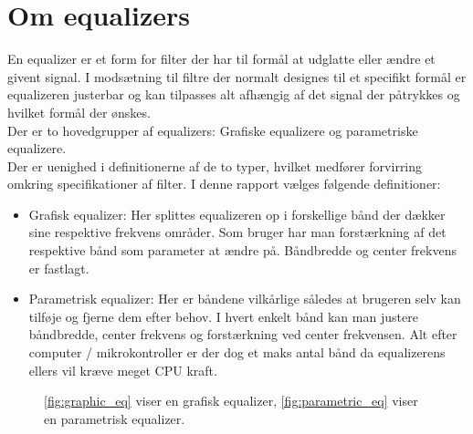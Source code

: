 \section{Om equalizers}\label{sec:equalizer}

En equalizer er et form for filter der har til formål at udglatte eller ændre et givent signal. I modsætning til filtre der normalt designes til et specifikt formål er equalizeren justerbar og kan tilpasses alt afhængig af det signal der påtrykkes og hvilket formål der ønskes.\\

Der er to hovedgrupper af equalizers: Grafiske equalizere og parametriske equalizere.\\
Der er uenighed i definitionerne af de to typer, hvilket medfører forvirring omkring specifikationer af filter. I denne rapport vælges følgende definitioner:

\begin{itemize}
	\item Grafisk equalizer: Her splittes equalizeren op i forskellige bånd der dækker sine respektive frekvens områder. Som bruger har man forstærkning af det respektive bånd som parameter at ændre på. Båndbredde og center frekvens er fastlagt.
	\item Parametrisk equalizer: Her er båndene vilkårlige således at brugeren selv kan tilføje og fjerne dem efter behov. I hvert enkelt bånd kan man justere båndbredde, center frekvens og forstærkning ved center frekvensen. Alt efter computer / mikrokontroller er der dog et maks antal bånd da equalizerens ellers vil kræve meget CPU kraft. 
\end{itemize}  


\begin{figure}[h]
	\centering
  	\caption{\ref{fig:graphic_eq} viser en grafisk equalizer, \ref{fig:parametric_eq} viser en parametrisk equalizer.}
	\label{fig:om_eq}
\end{figure}
\FloatBlock

